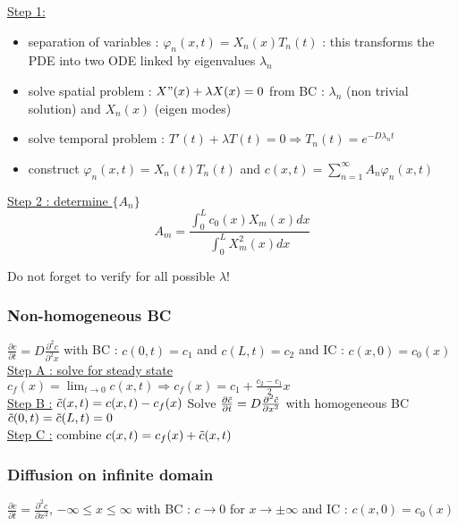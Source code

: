 \documentclass[../main.tex]{subfiles}
\begin{document}
\quad \underline{Step 1:}\begin{itemize}
    \item separation of variables : $\varphi_n(x,t) = X_n(x) T_n(t)$ : this transforms the PDE into two ODE linked by eigenvalues $\lambda_n$\\
    \item solve spatial problem : $X"(x) + \lambda X(x) = 0$ from BC : $\lambda_n$ (non trivial solution) and $X_n(x)$ (eigen modes)\\
    \item solve temporal problem : $T'(t) + \lambda T(t) = 0 \Rightarrow T_n(t) = e^{-D\lambda_n t}$\\
    \item construct $\varphi_n(x,t) = X_n(t)T_n(t)$ and $c(x,t) = \sum_{n=1}^\infty A_n \varphi_n(x,t)$
\end{itemize}
\quad \underline{Step 2 : determine $\{A_n\}$}\\
\begin{equation}
    A_m = \frac{\int_0^L c_0(x) X_m(x)dx}{\int_0^L X_m^2(x)dx}
\end{equation}

\warning Do not forget to verify for all possible $\lambda$!\\

\subsubsection{Non-homogeneous BC}
$\frac{\partial c}{\partial t} = D\frac{\partial^2 c}{\partial^2 x}$ with BC : $c(0,t) = c_1$ and $c(L,t) = c_2$ and IC : $c(x,0) = c_0(x)$\\

\quad \underline{Step A : solve for steady state} $c_f(x) = \lim_{t\rightarrow 0}c(x,t) \Rightarrow c_f(x) = c_1 + \frac{c_2 - c_1}{2}x$\\

\quad \underline{Step B :} $\Tilde{c}(x,t) = c(x,t)-c_f(x)$ Solve $\frac{\partial \Tilde{c}}{\partial t} = D\frac{\partial^2 \Tilde{c}}{\partial x^2}$ with homogeneous BC $\Tilde{c}(0,t) = \Tilde{c}(L,t)=0$ \\

\quad \underline{Step C :} combine $c(x,t) = c_f(x) + \Tilde{c}(x,t)$\\

\subsubsection{Diffusion on infinite domain}
$\frac{\partial c}{\partial t} = \frac{\partial^2 c}{\partial x^2}$, $-\infty \leq x \leq \infty$ with BC : $c\rightarrow 0$ for $x\rightarrow \pm \infty$ and IC : $c(x,0) = c_0(x)$\\
\end{document}
